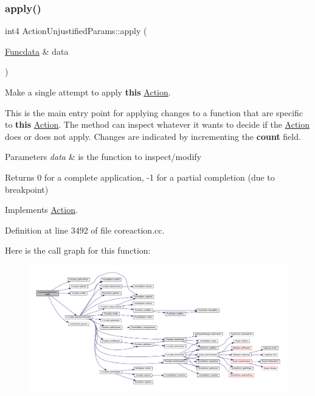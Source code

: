 \subsubsection{\texorpdfstring{apply()}{apply()}}
{\footnotesize\ttfamily int4 Action\+Unjustified\+Params\+::apply (\begin{DoxyParamCaption}\item[{\mbox{\hyperlink{class_funcdata}{Funcdata}} \&}]{data }\end{DoxyParamCaption})\hspace{0.3cm}{\ttfamily [virtual]}}



Make a single attempt to apply {\bfseries{this}} \mbox{\hyperlink{class_action}{Action}}. 

This is the main entry point for applying changes to a function that are specific to {\bfseries{this}} \mbox{\hyperlink{class_action}{Action}}. The method can inspect whatever it wants to decide if the \mbox{\hyperlink{class_action}{Action}} does or does not apply. Changes are indicated by incrementing the {\bfseries{count}} field. 
\begin{DoxyParams}{Parameters}
{\em data} & is the function to inspect/modify \\
\hline
\end{DoxyParams}
\begin{DoxyReturn}{Returns}
0 for a complete application, -\/1 for a partial completion (due to breakpoint) 
\end{DoxyReturn}


Implements \mbox{\hyperlink{class_action_aac1c3999d6c685b15f5d9765a4d04173}{Action}}.



Definition at line 3492 of file coreaction.\+cc.

Here is the call graph for this function\+:
\nopagebreak
\begin{figure}[H]
\begin{center}
\leavevmode
\includegraphics[width=350pt]{class_action_unjustified_params_a76dd93b62ac18bb4d18cba2a79c0ac55_cgraph}
\end{center}
\end{figure}
\mbox{\label{class_action_unjustified_params_a07403536c15bc35659c34d1dec3b2c11}} 
